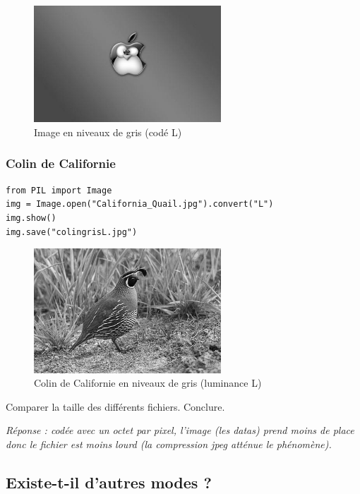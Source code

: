 \documentclass[11pt]{article}
\begin{document}
\begin{figure}[htbp]
\centering
\includegraphics[width=7cm]{pommegriseL.jpg}
\caption{Image en niveaux de gris (codé L)}
\end{figure}


\subsubsection{Colin de Californie}
\label{sec:orge8ead10}

\begin{verbatim}
from PIL import Image
img = Image.open("California_Quail.jpg").convert("L")
img.show()
img.save("colingrisL.jpg")
\end{verbatim}


\begin{figure}[htbp]
\centering
\includegraphics[width=7cm]{colingrisL.jpg}
\caption{Colin de Californie en niveaux de gris (luminance L)}
\end{figure}

Comparer la taille des différents fichiers. Conclure.



\emph{Réponse : codée avec un octet par pixel, l'image (les datas) prend moins de place donc le fichier est moins lourd (la compression jpeg atténue le phénomène).}

\subsection{Existe-t-il d'autres modes ?}
\label{sec:org35bd427}
\end{document}
